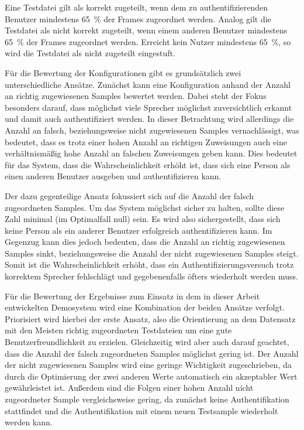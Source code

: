 Eine Testdatei gilt als korrekt zugeteilt, wenn dem zu authentifizierenden Benutzer mindestens 65~\% der Frames zugeordnet werden.
Analog gilt die Testdatei als nicht korrekt zugeteilt, wenn einem anderen Benutzer mindestens 65~\% der Frames zugeordnet werden.
Erreicht kein Nutzer mindestens 65~\%, so wird die Testdatei als nicht zugeteilt eingestuft.

Für die Bewertung der Konfigurationen gibt es grundsätzlich zwei unterschiedliche Ansätze.
Zunächst kann eine Konfiguration anhand der Anzahl an richtig zugewiesenen Samples bewertet werden.
Dabei steht der Fokus besonders darauf, dass möglichst viele Sprecher möglichst zuversichtlich erkannt und damit auch authentifiziert werden.
In dieser Betrachtung wird allerdings die Anzahl an falsch, beziehungsweise nicht zugewiesenen Samples vernachlässigt, was bedeutet, dass es trotz einer hohen Anzahl an richtigen Zuweisungen auch eine verhältnismäßig hohe Anzahl an falschen Zuweisungen geben kann.
Dies bedeutet für das System, dass die Wahrscheinlichkeit erhöht ist, dass sich eine Person als einen anderen Benutzer ausgeben und authentifizieren kann.

Der dazu gegenteilige Ansatz fokussiert sich auf die Anzahl der falsch zugeordneten Samples.
Um das System möglichst sicher zu halten, sollte diese Zahl minimal (im Optimalfall null) sein.
Es wird also sichergestellt, dass sich keine Person als ein anderer Benutzer erfolgreich authentifizieren kann.
Im Gegenzug kann dies jedoch bedeuten, dass die Anzahl an richtig zugewiesenen Samples sinkt, beziehungsweise die Anzahl der nicht zugewiesenen Samples steigt.
Somit ist die Wahrscheinlichkeit erhöht, dass ein Authentifizierungsversuch trotz korrektem Sprecher fehlschlägt und gegebenenfalls öfters wiederholt werden muss.

Für die Bewertung der Ergebnisse zum Einsatz in dem in dieser Arbeit entwickelten Demosystem wird eine Kombination der beiden Ansätze verfolgt.
Priorisiert wird hierbei der erste Ansatz, also die Orientierung an dem Datensatz mit den Meisten richtig zugeordneten Testdateien um eine gute Benutzerfreundlichkeit zu erzielen.
Gleichzeitig wird aber auch darauf geachtet, dass die Anzahl der falsch zugeordneten Samples möglichst gering ist.
Der Anzahl der nicht zugewiesenen Samples wird eine geringe Wichtigkeit zugeschrieben, da durch die Optimierung der zwei anderen Werte automatisch ein akzeptabler Wert gewährleistet ist.
Außerdem sind die Folgen einer hohen Anzahl nicht zugeordneter Sample vergleichsweise gering, da zunächst keine Authentifikation stattfindet und die Authentifikation mit einem neuen Testsample wiederholt werden kann.

